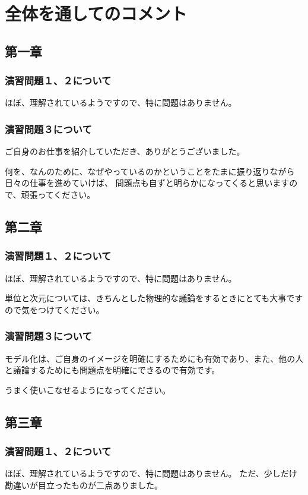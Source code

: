 \documentclass[uplatex,dvipdfmx,a4paper,11pt]{jsreport}
\begin{document}
\section*{全体を通してのコメント}
\subsection*{第一章}
\subsubsection*{演習問題１、２について}
ほぼ、理解されているようですので、特に問題はありません。

\subsubsection*{演習問題３について}

ご自身のお仕事を紹介していただき、ありがとうございました。

何を、なんのために、なぜやっているのかということをたまに振り返りながら日々の仕事を進めていけば、
問題点も自ずと明らかになってくると思いますので、頑張ってください。


\subsection*{第二章}
\subsubsection*{演習問題１、２について}
ほぼ、理解されているようですので、特に問題はありません。

単位と次元については、きちんとした物理的な議論をするときにとても大事ですので気をつけてください。

\subsubsection*{演習問題３について}

モデル化は、ご自身のイメージを明確にするためにも有効であり、また、他の人と議論するためにも問題点を明確にできるので有効です。

うまく使いこなせるようになってください。

\subsection*{第三章}
\subsubsection*{演習問題１、２について}
ほぼ、理解されているようですので、特に問題はありません。
ただ、少しだけ勘違いが目立ったものが二点ありました。
\end{document}
